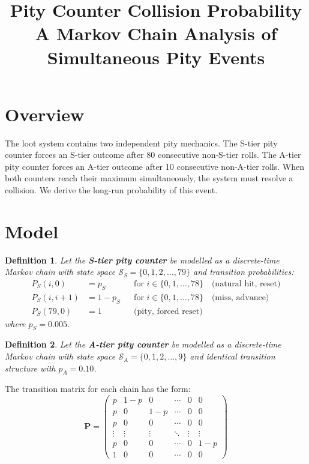 \documentclass[11pt,a4paper]{article}
\title{\textbf{Pity Counter Collision Probability}\\[0.3em]
\large A Markov Chain Analysis of Simultaneous Pity Events}
\author{}
\date{}
\newtheorem{definition}{Definition}
\begin{document}
\maketitle

\section{Overview}

The loot system contains two independent pity mechanics. The S-tier pity counter forces an S-tier outcome after 80 consecutive non-S-tier rolls. The A-tier pity counter forces an A-tier outcome after 10 consecutive non-A-tier rolls. When both counters reach their maximum simultaneously, the system must resolve a collision. We derive the long-run probability of this event.

\section{Model}

\begin{definition}
Let the \textbf{S-tier pity counter} be modelled as a discrete-time Markov chain with state space $\mathcal{S}_S = \{0, 1, 2, \ldots, 79\}$ and transition probabilities:
\begin{align}
P_S(i, 0)   &= p_S           &&\text{for } i \in \{0, 1, \ldots, 78\} \quad \text{(natural hit, reset)} \\
P_S(i, i+1) &= 1 - p_S       &&\text{for } i \in \{0, 1, \ldots, 78\} \quad \text{(miss, advance)} \\
P_S(79, 0)  &= 1             &&\text{(pity, forced reset)}
\end{align}
where $p_S = 0.005$.
\end{definition}

\begin{definition}
Let the \textbf{A-tier pity counter} be modelled as a discrete-time Markov chain with state space $\mathcal{S}_A = \{0, 1, 2, \ldots, 9\}$ and identical transition structure with $p_A = 0.10$.
\end{definition}

The transition matrix for each chain has the form:
\[
\mathbf{P} = 
\begin{pmatrix}
p     & 1-p   & 0     & \cdots & 0     & 0     \\
p     & 0     & 1-p   & \cdots & 0     & 0     \\
p     & 0     & 0     & \cdots & 0     & 0     \\
\vdots& \vdots& \vdots& \ddots & \vdots& \vdots\\
p     & 0     & 0     & \cdots & 0     & 1-p   \\
1     & 0     & 0     & \cdots & 0     & 0     
\end{pmatrix}
\]
\end{document}
